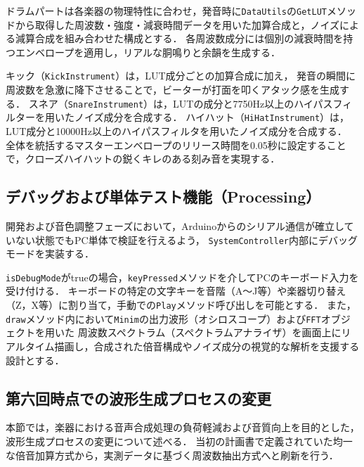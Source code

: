 \documentclass[lualatex,book,paper=a4paper,jafontsize=11.5pt,jafontscale=1.05]{jlreq}
\begin{document}
ドラムパートは各楽器の物理特性に合わせ，発音時に\texttt{DataUtils}の\texttt{GetLUT}メソッドから取得した周波数・強度・減衰時間データを用いた加算合成と，ノイズによる減算合成を組み合わせた構成とする．
各周波数成分には個別の減衰時間を持つエンベロープを適用し，リアルな胴鳴りと余韻を生成する．

キック（\texttt{KickInstrument}）は，LUT成分ごとの加算合成に加え，
発音の瞬間に周波数を急激に降下させることで，ビーターが打面を叩くアタック感を生成する．
スネア（\texttt{SnareInstrument}）は，LUTの成分と7750Hz以上のハイパスフィルターを用いたノイズ成分を合成する．
ハイハット（\texttt{HiHatInstrument}）は，LUT成分と10000Hz以上のハイパスフィルタを用いたノイズ成分を合成する．
全体を統括するマスターエンベロープのリリース時間を0.05秒に設定することで，クローズハイハットの鋭くキレのある刻み音を実現する．


\subsection{デバッグおよび単体テスト機能（Processing）}

開発および音色調整フェーズにおいて，Arduinoからのシリアル通信が確立していない状態でもPC単体で検証を行えるよう，
\texttt{SystemController}内部にデバッグモードを実装する．

\texttt{isDebugMode}がtrueの場合，\texttt{keyPressed}メソッドを介してPCのキーボード入力を受け付ける．
キーボードの特定の文字キーを音階（A〜J等）や楽器切り替え（Z，X等）に割り当て，手動での\texttt{Play}メソッド呼び出しを可能とする．
また，\texttt{draw}メソッド内において\texttt{Minim}の出力波形（オシロスコープ）および\texttt{FFT}オブジェクトを用いた
周波数スペクトラム（スペクトラムアナライザ）を画面上にリアルタイム描画し，合成された倍音構成やノイズ成分の視覚的な解析を支援する設計とする．


\subsection{第六回時点での波形生成プロセスの変更}

本節では，楽器における音声合成処理の負荷軽減および音質向上を目的とした，波形生成プロセスの変更について述べる．
当初の計画書で定義されていた均一な倍音加算方式から，実測データに基づく周波数抽出方式へと刷新を行う．
\end{document}
